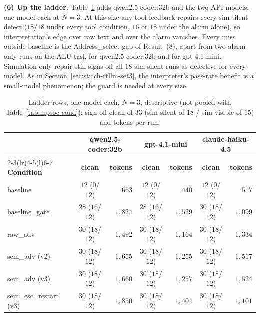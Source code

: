 \documentclass[11pt]{article}
\begin{document}
\textbf{(6) Up the ladder.} Table~\ref{tab:mpsoc-ladder} adds
qwen2.5-coder:32b and the two API models, one model each at $N{=}3$. At this
size any tool feedback repairs every sim-silent defect ($18/18$ under every tool
condition, $16$ or $18$ under the alarm alone), so interpretation's edge over
raw text and over the alarm vanishes. Every miss outside baseline is the
Address\_select gap of Result~(8), apart from two alarm-only runs on the ALU
task for qwen2.5-coder:32b and for gpt-4.1-mini. Simulation-only repair still
signs off all $18$ sim-silent runs as defective for every model. As in
Section~\ref{sec:stitch-rtllm-set3}, the interpreter's pass-rate benefit is a
small-model phenomenon; the guard is needed at every size.

\begin{table}[!htbp]
\centering
\caption{Ladder rows, one model each, $N{=}3$, descriptive (not pooled with
Table~\ref{tab:mpsoc-cond}): sign-off clean of $33$ (sim-silent of $18$ /
sim-visible of $15$) and tokens per run.}
\label{tab:mpsoc-ladder}
\small
\begin{tabular}{@{}l cr cr cr@{}}
\toprule
 & \multicolumn{2}{c}{\textbf{qwen2.5-coder:32b}} & \multicolumn{2}{c}{\textbf{gpt-4.1-mini}} & \multicolumn{2}{c}{\textbf{claude-haiku-4.5}} \\
\cmidrule(lr){2-3}\cmidrule(lr){4-5}\cmidrule(l){6-7}
\textbf{Condition} & \textbf{clean} & \textbf{tokens} & \textbf{clean} & \textbf{tokens} & \textbf{clean} & \textbf{tokens} \\
\midrule
baseline               & $12$ ($0$/$12$)  & $663$     & $12$ ($0$/$12$)  & $440$     & $12$ ($0$/$12$)  & $517$ \\
baseline\_gate         & $28$ ($16$/$12$) & $1{,}824$ & $28$ ($16$/$12$) & $1{,}529$ & $30$ ($18$/$12$) & $1{,}099$ \\
raw\_adv               & $30$ ($18$/$12$) & $1{,}492$ & $30$ ($18$/$12$) & $1{,}164$ & $30$ ($18$/$12$) & $1{,}334$ \\
sem\_adv (v2)          & $30$ ($18$/$12$) & $1{,}655$ & $30$ ($18$/$12$) & $1{,}255$ & $30$ ($18$/$12$) & $1{,}517$ \\
sem\_adv (v3)          & $30$ ($18$/$12$) & $1{,}660$ & $30$ ($18$/$12$) & $1{,}257$ & $30$ ($18$/$12$) & $1{,}524$ \\
sem\_esc\_restart (v3) & $30$ ($18$/$12$) & $1{,}850$ & $30$ ($18$/$12$) & $1{,}404$ & $30$ ($18$/$12$) & $1{,}101$ \\
\bottomrule
\end{tabular}
\end{table}
\end{document}
